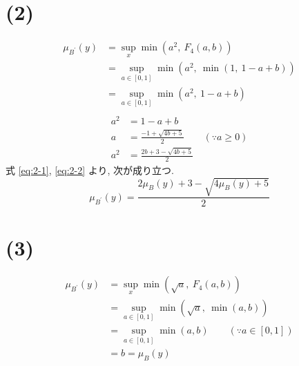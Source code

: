 \documentclass[uplatex, a4j, 10pt, fleqn, dvipdfmx]{article}
\begin{document}
\section*{(2)}

\begin{align}
	\mu_{B^{'}}(y)
	 & = \sup_{x} \min \left( a^2, ~ F_4 \left( a, b \right) \right) \nonumber                       \\
	 & = \sup_{a \in [0, 1]} \min \left( a^2, ~ \min \left( 1, ~ 1 - a + b \right) \right) \nonumber \\
	 & = \sup_{a \in [0, 1]} \min \left( a^2, ~  1 - a + b \right)\nonumber                          \\
	\label{eq:2-1}
\end{align}
\begin{align}
	a^2 & = 1 - a + b \nonumber                                                               \\
	a   & = \frac{-1 + \sqrt{ 4b + 5 }}{2} \qquad \left( \because a \geq 0  \right) \nonumber \\
	a^2 & = \frac{2b + 3 - \sqrt{4b + 5}}{2}
	\label{eq:2-2}
\end{align}
式 \eqref{eq:2-1}, \eqref{eq:2-2} より, 次が成り立つ.
\begin{equation}
	\mu_{B^{'}}(y) = \frac{2\mu_B(y) + 3 - \sqrt{4\mu_B(y) + 5}}{2}
\end{equation}

\section*{(3)}

\begin{align}
	\mu_{B^{'}}(y)
	 & = \sup_{x} \min \left( \sqrt{a}, ~ F_4 \left( a, b \right) \right) \nonumber             \\
	 & = \sup_{a \in [0, 1]} \min \left( \sqrt{a}, ~ \min \left( a, b \right) \right) \nonumber \\
	 & = \sup_{a \in [0, 1]} \min \left( a, b \right) \qquad (\because a \in [0, 1]) \nonumber  \\
	 & = b = \mu_B(y)
\end{align}
\end{document}
